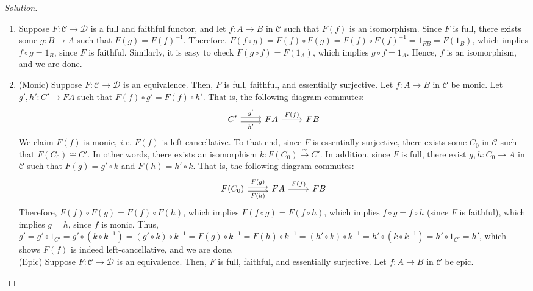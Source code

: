 \documentclass[]{amsbook}
\newcommand{\0}{\mathbf{0}}
\newcommand{\1}{\mathbf{1}}
\newcommand{\mc}[1]{\mathcal{#1}}
\newenvironment{solution}
    {\begin{proof}[Solution]}{\end{proof}}
\begin{document}
\begin{solution}
\begin{enumerate}
    \item Suppose $F: \mc{C} \to \mc{D}$ is a full and faithful functor, and
    let $f: A \to B$ in $\mc{C}$ such that $F(f)$ is an isomorphism. Since $F$
    is full, there exists some $g: B \to A$ such that $F(g) = F(f)^{-1}$.
    Therefore, $F(f \circ g) = F(f) \circ F(g) = F(f) \circ F(f)^{-1} = 1_{FB}
    = F(1_B)$, which implies $f \circ g = 1_B$, since $F$ is faithful.
    Similarly, it is easy to check $F(g \circ f) = F(1_A)$, which implies
    $g \circ f = 1_A$. Hence, $f$ is an isomorphism, and we are done.

    \item (Monic) Suppose $F: \mc{C} \to \mc{D}$ is an equivalence. Then, $F$
    is full, faithful, and essentially surjective. Let $f: A \to B$ in $\mc{C}$
    be monic. Let $g', h': C' \to FA$ such that $F(f) \circ g' = F(f) \circ h'$.
    That is, the following diagram commutes:
    \[
    \begin{tikzcd}
        C' \arrow[r, shift left, "g'"]
           \arrow[r, shift right, swap, "h'"]
           & FA \arrow[r, "F(f)"]
                & FB
    \end{tikzcd}
    \]
    We claim $F(f)$ is monic, \emph{i.e.} $F(f)$ is left-cancellative. To that
    end, since $F$ is essentially surjective, there exists some $C_0$ in
    $\mc{C}$ such that $F(C_0) \cong C'$. In other words, there exists an
    isomorphism $k: F(C_0) \xrightarrow{\sim} C'$. In addition, since $F$ is
    full, there exist $g, h: C_0 \to A$ in $\mc{C}$ such that $F(g) = g' \circ
    k$ and $F(h) = h' \circ k$. That is, the following diagram commutes:
    \[
    \begin{tikzcd}
    F(C_0) \arrow[r, shift left, "F(g)"]
    \arrow[r, shift right, swap, "F(h)"]
    & FA \arrow[r, "F(f)"]
    & FB
    \end{tikzcd}
    \]
    Therefore, $F(f) \circ F(g) = F(f) \circ F(h)$, which implies $F(f \circ g)
    = F(f \circ h)$, which implies $f \circ g = f \circ h$ (since $F$ is
    faithful), which implies $g = h$, since $f$ is monic. Thus, $g' = g' \circ
    1_{C'} = g' \circ (k \circ k^{-1}) = (g' \circ k) \circ k^{-1} = F(g) \circ
    k^{-1} = F(h) \circ k^{-1} = (h' \circ k) \circ k^{-1} = h' \circ (k \circ
    k^{-1}) = h' \circ 1_{C'} = h'$, which shows $F(f)$ is indeed
    left-cancellative, and we are done.\\
    (Epic) Suppose $F: \mc{C} \to \mc{D}$ is an equivalence. Then, $F$ is full,
    faithful, and essentially surjective. Let $f: A \to B$ in $\mc{C}$ be epic.

\end{enumerate}
\end{solution}
\end{document}
